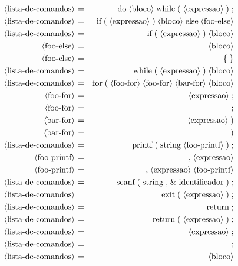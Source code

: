 \documentclass[12pt,a4papper]{article}
\newcommand{\pn}[1]{\langle \textnormal{#1} \rangle}
\newcommand{\pp}{\models}
\newcommand{\ww}{\;}
\newcommand{\sm}[1]{\textnormal{#1}}
\begin{document}
\begin{landscape}
\begin{eqnarray}
\pn{lista-de-comandos} &\pp& \sm{do} \ww \pn{bloco} \ww \sm{while} \ww \sm{(} \ww \pn{expressao} \ww \sm{)} \ww \sm{;} \\
\pn{lista-de-comandos} &\pp& \sm{if} \ww \sm{(} \ww \pn{expressao} \ww \sm{)} \ww \pn{bloco} \ww \sm{else} \ww \pn{foo-else} \\
\pn{lista-de-comandos} &\pp& \sm{if} \ww \sm{(} \ww \pn{expressao} \ww \sm{)} \ww \pn{bloco} \\
         \pn{foo-else} &\pp& \pn{bloco} \\  
         \pn{foo-else} &\pp& \sm{\{} \ww \sm{\}}\\
\pn{lista-de-comandos} &\pp& \sm{while} \ww \sm{(} \ww \pn{expressao} \ww \sm{)} \ww \pn{bloco}\\
\pn{lista-de-comandos} &\pp& \sm{for} \ww \sm{(} \ww \pn{foo-for} \ww \pn{foo-for} \ww \pn{bar-for} \ww \pn{bloco}   \\
          \pn{foo-for} &\pp& \pn{expressao} \ww ;\\
          \pn{foo-for} &\pp& \sm{;}\\
          \pn{bar-for} &\pp& \pn{expressao} \ww \sm{)}\\
          \pn{bar-for} &\pp& \sm{)}\\
\pn{lista-de-comandos} &\pp& \sm{printf} \ww \sm{(} \ww \sm{string} \ww \pn{foo-printf} \ww \sm{)} \ww \sm{;}\\
       \pn{foo-printf} &\pp&  \sm{,} \ww \pn{expressao} \\
       \pn{foo-printf} &\pp&  \sm{,} \ww \pn{expressao} \ww \pn{foo-printf}\\
\pn{lista-de-comandos} &\pp&  \sm{scanf} \ww \sm{(} \ww \sm{string} \ww \sm{,} \ww \sm{\&} \ww \sm{identificador} \ww \sm{)} \ww \sm{;} \\
\pn{lista-de-comandos} &\pp&  \sm{exit} \ww \sm{(} \ww \pn{expressao} \ww \sm{)} \ww \sm{;} \\
\pn{lista-de-comandos} &\pp&  \sm{return} \ww \sm{;} \\
\pn{lista-de-comandos} &\pp&  \sm{return} \ww \sm{(} \ww \pn{expressao} \ww \sm{)} \ww  \sm{;} \\
\pn{lista-de-comandos} &\pp&  \pn{expressao} \ww \sm{;} \\
\pn{lista-de-comandos} &\pp&  \sm{;} \\
\pn{lista-de-comandos} &\pp&  \pn{bloco}
\end{eqnarray}




\end{landscape}
\end{document}
